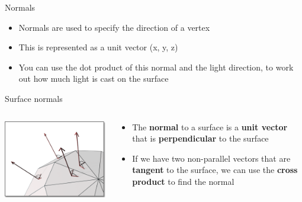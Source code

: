 \begin{frame}{Normals}
	\begin{itemize}
		\item Normals are used to specify the direction of a vertex
		\pause\item This is represented as a unit vector (x, y, z)
		\pause\item You can use the dot product of this normal and the light direction, to work out how much light is cast on the surface  
	\end{itemize}
\end{frame}

\begin{frame}{Surface normals}
\begin{columns}
	\pause
	\begin{column}{0.33\textwidth}
		\includegraphics[width=\textwidth]{surface_normal}
	\end{column}
	\begin{column}{0.65\textwidth}
		\begin{itemize}
			\item The \textbf{normal} to a surface is a \textbf{unit vector} that is \textbf{perpendicular} to the surface
			\pause\item If we have two non-parallel vectors that are \textbf{tangent} to the surface, we can use the \textbf{cross product} to find the normal
		\end{itemize}
	\end{column}
\end{columns}
\pause
\begin{columns}
	\begin{column}{0.33\textwidth}

\end{column}
\end{columns}
\end{frame}

